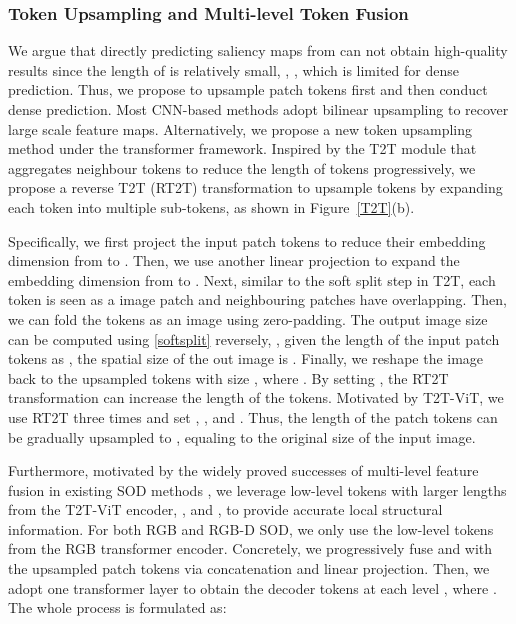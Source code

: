 \documentclass[10pt,twocolumn,letterpaper]{article}
\begin{document}
\subsubsection{Token Upsampling and Multi-level Token Fusion}
We argue that directly predicting saliency maps from  can not obtain high-quality results since the length of  is relatively small, \ie, , which is limited for dense prediction.
Thus, we propose to upsample patch tokens first and then conduct dense prediction.
Most CNN-based methods \cite{GateNet,zhao2019EGNet,liu2020S2MA,Fu2020JLDCF} adopt bilinear upsampling to recover large scale feature maps. 
Alternatively, we propose a new token upsampling method under the transformer framework. Inspired by the T2T module \cite{yuan2021tokens} that aggregates neighbour tokens to reduce the length of tokens progressively, we propose a reverse T2T (RT2T) transformation to upsample tokens by expanding each token into multiple sub-tokens, as shown in Figure~\ref{T2T}(b).

Specifically, we first project the input patch tokens to reduce their embedding dimension from  to .
Then, we use another linear projection to expand the embedding dimension from  to .
Next, similar to the soft split step in T2T, each token is seen as a  image patch and neighbouring patches have  overlapping. Then, we can fold the tokens as an image using  zero-padding. The output image size can be computed using \eqref{softsplit} reversely, \ie, given the length of the input patch tokens as , the spatial size of the out image is . Finally, we reshape the image back to the upsampled tokens with size , where .
By setting , the RT2T transformation can increase the length of the tokens. Motivated by T2T-ViT, we use RT2T three times and set , , and . Thus, the length of the patch tokens can be gradually upsampled to , equaling to the original size of the input image.

Furthermore, motivated by the widely proved successes of multi-level feature fusion in existing SOD methods \cite{hou2018dss,MINet-CVPR2020,GateNet,fan2020bbsnet,luo2020Cas-Gnn}, we leverage low-level tokens with larger lengths from the T2T-ViT encoder, \ie,  and , to provide accurate local structural information.
For both RGB and RGB-D SOD, we only use the low-level tokens from the RGB transformer encoder.
Concretely, we progressively fuse  and  with the upsampled patch tokens via concatenation and linear projection. Then, we adopt one transformer layer to obtain the decoder tokens  at each level , where . The whole process is formulated as:
\end{document}
